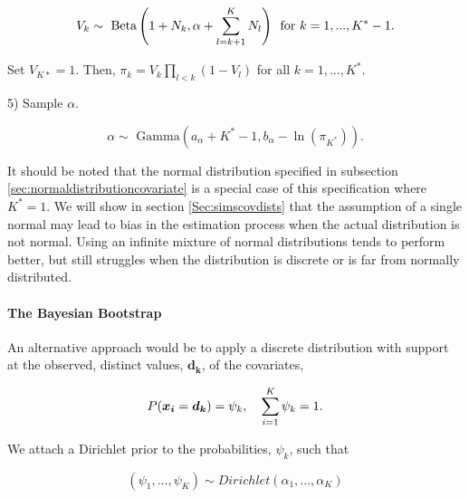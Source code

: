 \documentclass[
  12pt,
]{article}
\begin{document}
\begin{list}{}{}
\begin{equation}
 V_k \sim \text{ Beta}\left(1+N_k, \alpha+\sum_{l=k+1}^K N_l\right) \hspace{5px} \text{for } k=1,...,K^*-1.
\end{equation}

Set $V_{K*}=1$.  Then, $\pi_k = V_k\prod_{l<k}(1-V_l)$ for all $k=1,...,K^*$.

\item[5)] Sample $\alpha$.

\begin{equation}
  \alpha \sim \text{ Gamma}\left(a_\alpha + K^* -1, b_\alpha - \ln(\pi_{K^*}) \right).
\end{equation}

\end{list}

It should be noted that the normal distribution specified in subsection
\ref{sec:normaldistributioncovariate} is a special case of this
specification where \(K^*=1\). We will show in section
\ref{Sec:simscovdists} that the assumption of a single normal may lead
to bias in the estimation process when the actual distribution is not
normal. Using an infinite mixture of normal distributions tends to
perform better, but still struggles when the distribution is discrete or
is far from normally distributed.

\paragraph{The Bayesian Bootstrap} \hspace{5px} \newline

\vspace{-10px}

An alternative approach would be to apply a discrete distribution with
support at the observed, distinct values, \(\boldsymbol{d_k}\), of the
covariates,

\begin{equation}
P(\boldsymbol{x_i}=\boldsymbol{d_k}) = \psi_k, \hspace{10px} \sum_{i=1}^K \psi_k = 1.
\end{equation}

We attach a Dirichlet prior to the probabilities, \(\psi_k\), such that

\begin{equation}
(\psi_1, ..., \psi_K) \sim Dirichlet(\alpha_1,...,\alpha_K)
\end{equation}
\end{document}
